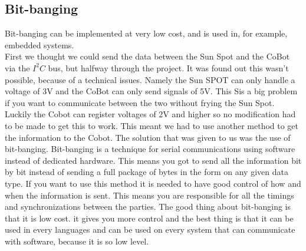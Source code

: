 \documentclass[a4,english]{article}
\begin{document}
\subsection{Bit-banging}
\label{subsec:bitbang}
Bit-banging can be implemented at very low cost, and is used in, for example, embedded systems.\\
First we thought we could send the data between the Sun Spot and the CoBot via the $I^2C$ bus, but halfway through the project. It was found out this wasn't possible, because of a technical issues. Namely the Sun SPOT can only handle a voltage of 3V and the CoBot can only send signals of 5V. This Sis a big problem if you want to communicate between the two without frying the Sun Spot. Luckily the Cobot can register voltages of 2V and higher so no modification had to be made to get this to work. 
This meant we had to use another method to get the information to the Cobot. The solution that was given to us was the use of bit-banging. Bit-banging is a technique for serial communications using software instead of dedicated hardware. This means you got to send all the information bit by bit instead of sending a full package of bytes in the form on any given data type. If you want to use this method it is needed to have good control of how and when the information is sent. This means you are responsible for all the timings and synchronizations between the parties. The good thing about bit-banging is that it is low cost. it gives you more control and the best thing is that it can be used in every languages and can be used on every system that can communicate with software, because it is so low level.
\end{document}
